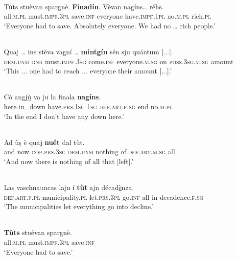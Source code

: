 \ea
\label{}
\\
\gll Tùts stuèvan spargnè. \textbf{Finadín}. Vèvan nagíns… réhs.\\
all.\textsc{m.pl} must.\textsc{impf.3pl} save.\textsc{inf} everyone have.\textsc{impf.1pl} no.\textsc{m.pl} rich.\textsc{pl}\\
\glt `Everyone had to save. Absolutely everyone. We had no … rich people.'
\z

\ea
\label{}
\\
	\gll Quaj … ins stèva vagní … \textbf{mintgín} sén sju quántum [...].\\
\textsc{dem.unm} {} \textsc{gnr} must.\textsc{impf.3sg} come.\textsc{inf} {} everyone.\textsc{m.sg} on \textsc{poss.3sg.m.sg} amount\\
\glt `This ... one had to reach ... everyone their amount [...].'
\z

\ea
\label{}
\\
\gll  Cò angj\underline{ù} va ju la finala \textbf{nagíns}.  \\
here in\_down have.\textsc{prs.1sg} \textsc{1sg} \textsc{def.art.f.sg} end no.\textsc{m.pl}  \\
\glt `In the end I don’t have any down here.'
\z

\ea
\label{}
\\
\gll  Ad ùṣ è quaj \textbf{nuét} dal tùt.   \\
and now \textsc{cop.prs.3sg} \textsc{dem.unm} nothing of.\textsc{def.art.m.sg} all\\
\glt `And now there is nothing of all that [left].'
\z

\ea
\label{}
\\
\gll Laṣ vaschnauncas lajn í \textbf{tùt} ajn décad\underline{è}nza.\\
\textsc{def.art.f.pl} municipality.\textsc{pl} let.\textsc{prs.3pl} go.\textsc{inf} all in decadence.\textsc{f.sg}  \\
\glt `The municipalities let everything go into decline.'
\z

\ea
\label{}
\\
\gll    \textbf{Tùts} stuèvan spargnè.\\
all.\textsc{m.pl} must.\textsc{impf.3pl} save.\textsc{inf}\\
\glt `Everyone had to save.'
\z

